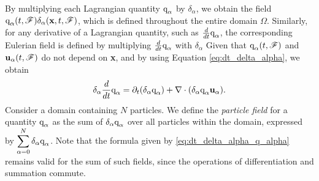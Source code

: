 By multiplying each Lagrangian quantity $\text q_\alpha$​ by $\delta_\alpha$​, we obtain the field $\text q_\alpha(t,\mathscr{F})\delta_\alpha(\textbf{x},t,\mathscr{F})$, which is defined throughout the entire domain $\Omega$. 
Similarly, for any derivative of a Lagrangian quantity, such as $\frac{d}{dt} \text q_\alpha$​, the corresponding Eulerian field is defined by multiplying $\frac{d}{dt} \text q_\alpha$ with $\delta_\alpha$ 
Given that $\text q_\alpha(t,\mathscr{F})$ and $\textbf{u}_\alpha(t,\mathscr{F})$ do not depend on \textbf{x}, and by using Equation \ref{eq:dt_delta_alpha}, we obtain
\begin{equation}
    \delta_\alpha \frac{d}{dt} \text q_\alpha
    = \partial_t (\delta_\alpha \text q_\alpha)
    + \mathbf{\nabla}\cdot (\delta_\alpha \text q_\alpha \textbf{u}_\alpha).
    \label{eq:dt_delta_alpha_q_alpha}
\end{equation}
Consider a domain containing $N$ particles. We define the \textit{particle field} for a quantity $\text q_\alpha$​ as the sum of $\delta_\alpha \text q_\alpha$ over all particles within the domain, expressed by $\displaystyle\sum_{\alpha=0}^N \delta_\alpha \text q_\alpha$​. 
Note that the formula given by \ref{eq:dt_delta_alpha_q_alpha} remains valid for the sum of such fields, since the operations of differentiation and summation commute.
